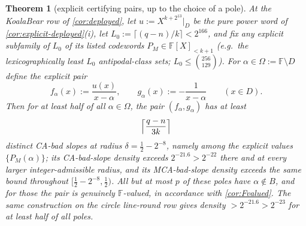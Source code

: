 \documentclass[11pt]{article}
\newtheorem{theorem}{Theorem}[section]
\theoremstyle{definition}
\theoremstyle{remark}
\newcommand{\F}{\mathbb{F}}
\newcommand{\B}{B}
\begin{document}
\begin{theorem}[explicit certifying pairs, up to the choice of a pole]\label{thm:explicit-pairs}
At the KoalaBear row of \cref{cor:deployed}, let $u:=X^{k+2^{13}}|_D$ be the pure power word of \cref{cor:explicit-deployed}\textup{(i)}, let $L_0:=\lceil(q-n)/k\rceil<2^{166}$, and fix any explicit subfamily of $L_0$ of its listed codewords $P_M\in\F[X]_{<k+1}$ \textup(e.g.\ the lexicographically least $L_0$ antipodal-class sets; $L_0\le\binom{256}{129}$\textup). For $\alpha\in\Omega:=\F\setminus D$ define the explicit pair
\[
f_\alpha(x):=\frac{u(x)}{x-\alpha},
\qquad
g_\alpha(x):=-\frac1{x-\alpha}
\qquad(x\in D).
\]
Then for at least half of all $\alpha\in\Omega$, the pair $(f_\alpha,g_\alpha)$ has at least
\[
\Bigl\lceil\frac{q-n}{3k}\Bigr\rceil
\]
distinct CA-bad slopes at radius $\delta=\frac12-2^{-8}$, namely among the explicit values $\{P_M(\alpha)\}$; its CA-bad-slope density exceeds $2^{-21.6}>2^{-22}$ there and at every larger integer-admissible radius, and its MCA-bad-slope density exceeds the same bound throughout $[\frac12-2^{-8},\frac12)$. All but at most $p$ of these poles have $\alpha\notin\B$, and for those the pair is genuinely $\F$-valued, in accordance with \cref{cor:Fvalued}. The same construction on the circle line-round row gives density $>2^{-21.6}>2^{-23}$ for at least half of all poles.
\end{theorem}
\end{document}
